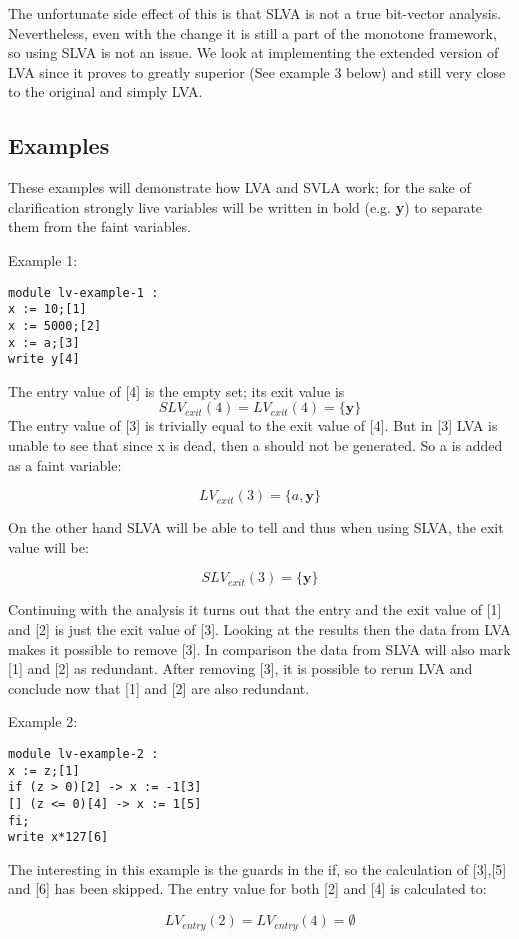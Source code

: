 \docpar
The unfortunate side effect of this is that SLVA is not a true bit-vector
analysis. Nevertheless, even with the change it is still a part of the
monotone framework, so using SLVA is not an issue.
  We look at implementing the extended version of LVA since it proves to
greatly superior (See example 3 below) and still very close to the original
and simply LVA.

\subsection{Examples}
These examples will demonstrate how LVA and SVLA work; for the sake of
clarification strongly live variables will be written in bold
(e.g. \textbf{y}) to separate them from the faint variables.

\docpar
Example 1:
\begin{lstlisting}
module lv-example-1 :
x := 10;[1]
x := 5000;[2]
x := a;[3]
write y[4]
\end{lstlisting}
The entry value of [4] is the empty set; its
exit value is 
\[ SLV_{exit}(4) = LV_{exit}(4) = \{\textbf{y}\}\]
The entry value of [3] is trivially equal to the
exit value of [4]. But in [3] LVA is unable to see
that since x is dead, then a should not be
generated. So a is added as a faint variable:

\[LV_{exit}(3) = \{a, \textbf{y}\}\]

On the other hand SLVA will be able to tell and thus
when using SLVA, the exit value will be:

\[SLV_{exit}(3) = \{\textbf{y}\}\]

Continuing with the analysis it turns out that the
entry and the exit value of [1] and [2] is just the
exit value of [3]. Looking at the results then the
data from LVA makes it possible to remove [3].
In comparison the data from SLVA will also mark [1]
and [2] as redundant.
  After removing [3], it is possible to rerun LVA
and conclude now that [1] and [2] are also redundant.

\docpar
Example 2:
\begin{lstlisting}
module lv-example-2 :
x := z;[1]
if (z > 0)[2] -> x := -1[3]
[] (z <= 0)[4] -> x := 1[5]
fi;
write x*127[6]
\end{lstlisting}

The interesting in this example is the guards in the if,
so the calculation of [3],[5] and [6] has been skipped.
The entry value for both [2] and [4] is calculated to:

\[LV_{entry}(2) = LV_{entry}(4) = \emptyset \]

